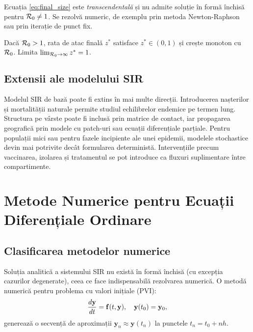 \begin{observatie}
Ecuația \eqref{eq:final_size} este \emph{transcendentală} și nu admite soluție
în formă închisă pentru $\mathcal{R}_0 \neq 1$. Se rezolvă numeric, de exemplu prin
metoda Newton-Raphson sau prin iterație de punct fix.
\end{observatie}

\begin{corolar}
Dacă $\mathcal{R}_0 > 1$, rata de atac finală $z^*$ satisface $z^* \in (0, 1)$ și
crește monoton cu $\mathcal{R}_0$. Limita $\lim_{\mathcal{R}_0 \to \infty} z^* = 1$.
\end{corolar}

\subsection{Extensii ale modelului SIR}
\label{subsec:sir_extensii}

Modelul SIR de bază poate fi extins în mai multe direcții. Introducerea nașterilor
și mortalității naturale permite studiul echilibrelor endemice pe termen lung.
Structura pe vârste poate fi inclusă prin matrice de contact, iar propagarea
geografică prin modele cu patch-uri sau ecuații diferențiale parțiale. Pentru
populații mici sau pentru fazele incipiente ale unei epidemii, modelele stochastice
devin mai potrivite decât formularea deterministă. Intervențiile precum vaccinarea,
izolarea și tratamentul se pot introduce ca fluxuri suplimentare între
compartimente.

\section{Metode Numerice pentru Ecuații Diferențiale Ordinare}
\label{sec:metode_numerice}

\subsection{Clasificarea metodelor numerice}
\label{subsec:clasificare_numerice}

Soluția analitică a sistemului SIR nu există în formă închisă (cu excepția
cazurilor degenerate), ceea ce face indispensabilă rezolvarea numerică.
O metodă numerică pentru problema cu valori inițiale (PVI):
\begin{equation}
\label{eq:pvi}
    \frac{d\mathbf{y}}{dt} = \mathbf{f}(t, \mathbf{y}), \quad \mathbf{y}(t_0) = \mathbf{y}_0,
\end{equation}
generează o secvență de aproximații $\mathbf{y}_n \approx \mathbf{y}(t_n)$ la
punctele $t_n = t_0 + nh$.

